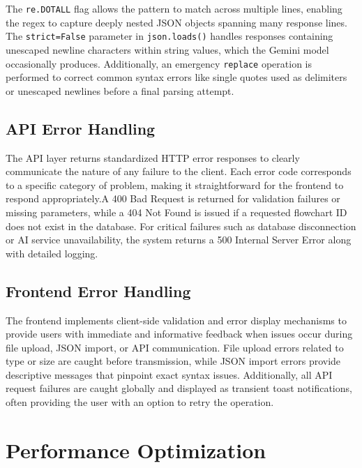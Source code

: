 The \texttt{re.DOTALL} flag allows the pattern to match across multiple lines, enabling the regex to capture deeply nested JSON objects spanning many response lines. The \texttt{strict=False} parameter in \texttt{json.loads()} handles responses containing unescaped newline characters within string values, which the Gemini model occasionally produces. Additionally, an emergency \texttt{replace} operation is performed to correct common syntax errors like single quotes used as delimiters or unescaped newlines before a final parsing attempt.

\subsection{API Error Handling}

\justifying
The API layer returns standardized HTTP error responses to clearly communicate the nature of any failure to the client. Each error code corresponds to a specific category of problem, making it straightforward for the frontend to respond appropriately.A 400 Bad Request is returned for validation failures or missing parameters, while a 404 Not Found is issued if a requested flowchart ID does not exist in the database. For critical failures such as database disconnection or AI service unavailability, the system returns a 500 Internal Server Error along with detailed logging.

\subsection{Frontend Error Handling}

\justifying
The frontend implements client-side validation and error display mechanisms to provide users with immediate and informative feedback when issues occur during file upload, JSON import, or API communication. File upload errors related to type or size are caught before transmission, while JSON import errors provide descriptive messages that pinpoint exact syntax issues. Additionally, all API request failures are caught globally and displayed as transient toast notifications, often providing the user with an option to retry the operation.


\section{Performance Optimization}
\label{sec:performance}

